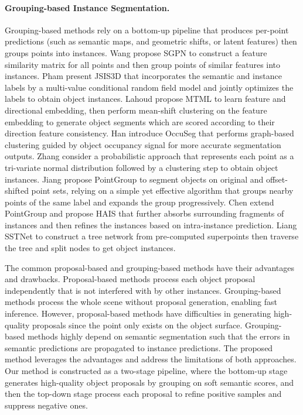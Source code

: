 \documentclass[10pt,twocolumn,letterpaper]{article}
\begin{document}
	
	\paragraph{Grouping-based Instance Segmentation.}
	Grouping-based methods rely on a bottom-up pipeline that produces per-point predictions (such as semantic maps, and geometric shifts, or latent features) then groups points into instances. Wang \etal \cite{wang2018sgpn} propose SGPN to construct a feature similarity matrix for all points and then group points of similar features into instances. Pham \etal \cite{pham2019jsis3d} present JSIS3D that incorporates the semantic and instance labels by a multi-value conditional random field model and jointly optimizes the labels to obtain object instances. Lahoud \etal \cite{lahoud20193d} propose MTML to learn feature and directional embedding, then perform mean-shift clustering on the feature embedding to generate object segments which are scored according to their direction feature consistency. Han \etal \cite{han2020occuseg} introduce OccuSeg that performs graph-based clustering guided by object occupancy signal for more accurate segmentation outputs. Zhang \etal \cite{zhang2021point} consider a probabilistic approach that represents each point as a tri-variate normal distribution followed by a clustering step to obtain object instances. Jiang \etal \cite{jiang2020pointgroup} propose PointGroup to segment objects on original and offset-shifted point sets, relying on a simple yet effective algorithm that groups nearby points of the same label and expands the group progressively. Chen \etal \cite{chen2021hierarchical} extend PointGroup and propose HAIS that further absorbs surrounding fragments of instances and then refines the instances based on intra-instance prediction. Liang \etal \cite{liang2021instance} SSTNet to construct a tree network from pre-computed superpoints then traverse the tree and split nodes to get object instances.
	
	The common proposal-based and grouping-based methods have their advantages and drawbacks. Proposal-based methods process each object proposal independently that is not interfered with by other instances. Grouping-based methods process the whole scene without proposal generation, enabling fast inference. However, proposal-based methods have difficulties in generating high-quality proposals since the point only exists on the object surface. Grouping-based methods highly depend on semantic segmentation such that the errors in semantic predictions are propagated to instance predictions. The proposed method leverages the advantages and address the limitations of both approaches. Our method is constructed as a two-stage pipeline, where the bottom-up stage generates high-quality object proposals by grouping on soft semantic scores, and then the top-down stage process each proposal to refine positive samples and suppress negative ones.
\end{document}
